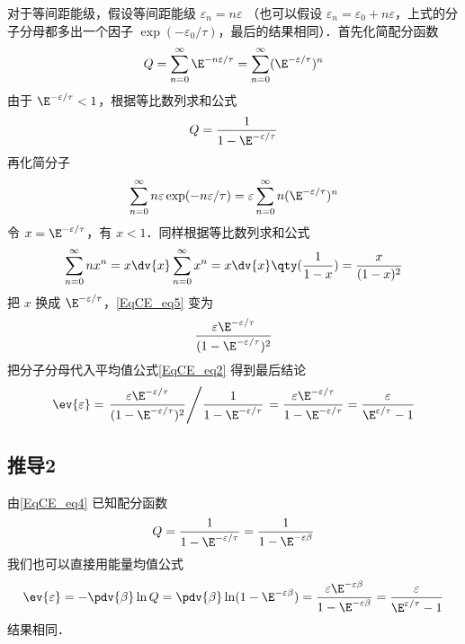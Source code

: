 对于等间距能级，假设等间距能级 $\varepsilon_n = n\varepsilon$ （也可以假设 $\varepsilon_n = \varepsilon_0 + n\varepsilon $，上式的分子分母都多出一个因子 $\exp(-\varepsilon_0/\tau)$，最后的结果相同）．首先化简配分函数
\begin{equation}
Q = \sum_{n = 0}^\infty \E^{-n\varepsilon /\tau}  = \sum_{n = 0}^\infty (\E^{-\varepsilon/\tau})^n
\end{equation}
由于 $\E^{-\varepsilon/\tau} < 1$，根据等比数列求和公式 %
\begin{equation}\label{EqCE_eq4}
Q = \frac{1}{1 - \E^{-\varepsilon /\tau}}
\end{equation}
再化简分子
\begin{equation}\label{EqCE_eq5}
\sum_{n = 0}^\infty  n\varepsilon \exp(-n\varepsilon /\tau)  = \varepsilon \sum_{n = 0}^\infty  n(\E^{-\varepsilon/\tau})^n
\end{equation}
令 $x = \E^{-\varepsilon/\tau}$，有 $x < 1$．同样根据等比数列求和公式
\begin{equation}
\sum_{n = 0}^\infty  n x^n = x\dv{x}\sum_{n = 0}^\infty x^n = x\dv{x} \qty(\frac{1}{1 - x}) = \frac{x}{(1 - x)^2}
\end{equation}
把 $x$ 换成 $\E^{-\varepsilon/\tau}$，\autoref{EqCE_eq5} 变为
\begin{equation}
\frac{\varepsilon \E^{-\varepsilon/\tau}}{(1 - \E^{-\varepsilon/\tau})^2}
\end{equation}
把分子分母代入平均值公式\autoref{EqCE_eq2} 得到最后结论
\begin{equation}
\ev{\varepsilon} = \left. \frac{\varepsilon \E^{-\varepsilon/\tau}}{(1 - \E^{-\varepsilon/\tau})^2} \middle/ \frac{1}{1 - \E^{-\varepsilon/\tau}}  \right. = \frac{\varepsilon \E^{-\varepsilon/\tau}}{1 - \E^{-\varepsilon/\tau}} = \frac{\varepsilon}{\E^{\varepsilon/\tau} - 1}
\end{equation}

\subsection{推导2}
由\autoref{EqCE_eq4} 已知配分函数
\begin{equation}
Q = \frac{1}{1 - \E^{-\varepsilon/\tau}} = \frac{1}{1 - \E^{-\varepsilon\beta}}
\end{equation}
我们也可以直接用能量均值公式
\begin{equation}
\ev{\varepsilon} = -\pdv{\beta} \ln Q
= \pdv{\beta} \ln (1 - \E^{-\varepsilon\beta}) = \frac{\varepsilon \E^{-\varepsilon\beta}}{1 - \E^{-\varepsilon\beta}} = \frac{\varepsilon}{\E^{\varepsilon /\tau} - 1}
\end{equation}
结果相同．
